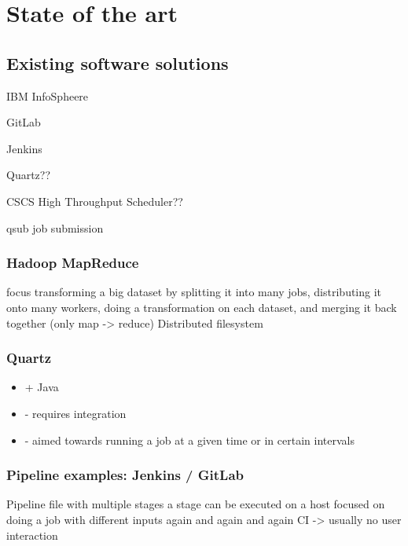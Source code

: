 \chapter{State of the art}

\section{Existing software solutions}

IBM InfoSpheere
\cite{infosphere:datastage}

GitLab \cite{gitlab:ci:yaml}

Jenkins \cite{jenkins:pipeline:jenkinsfile}

Quartz?? \cite{quartz:quickstart}

CSCS High Throughput Scheduler?? \cite{cscs:high_throughput}


qsub job submission %



\subsection{Hadoop MapReduce}

focus transforming a big dataset by splitting it into many jobs, distributing it onto many workers, doing a transformation on each dataset, and merging it back together (only map -> reduce)
Distributed filesystem

\subsection{Quartz}

\cite{quartz:main}
\cite{quartz:overview}

\begin{itemize}
	\item + Java
	\item - requires integration
	\item - aimed towards running a job at a given time or in certain intervals
\end{itemize}

\subsection{Pipeline examples: Jenkins / GitLab}

Pipeline file with multiple stages
a stage can be executed on a host
focused on doing a job with different inputs again and again and again
CI -> usually no user interaction

